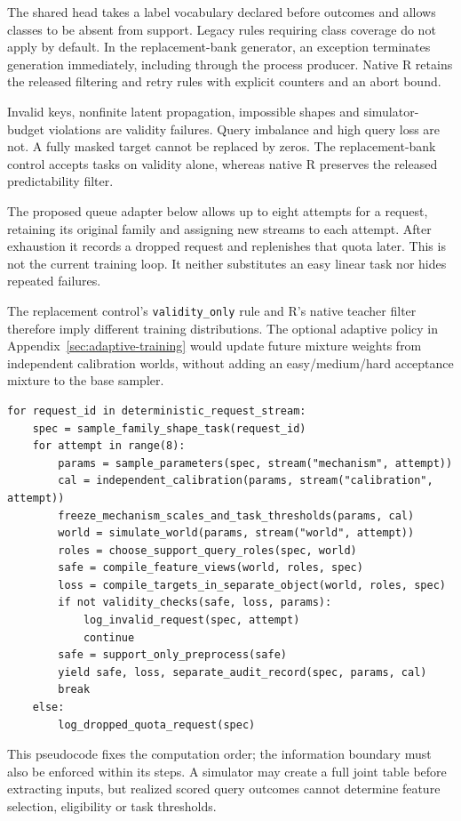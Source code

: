 \documentclass[11pt]{article}
\begin{document}
The shared head takes a label vocabulary declared before outcomes and allows classes to be absent from support. Legacy rules requiring class coverage do not apply by default. In the replacement-bank generator, an exception terminates generation immediately, including through the process producer. Native R retains the released filtering and retry rules with explicit counters and an abort bound.

Invalid keys, nonfinite latent propagation, impossible shapes and simulator-budget violations are validity failures. Query imbalance and high query loss are not. A fully masked target cannot be replaced by zeros. The replacement-bank control accepts tasks on validity alone, whereas native R preserves the released predictability filter.

The proposed queue adapter below allows up to eight attempts for a request, retaining its original family and assigning new streams to each attempt. After exhaustion it records a dropped request and replenishes that quota later. This is not the current training loop. It neither substitutes an easy linear task nor hides repeated failures.

The replacement control's \texttt{validity\_only} rule and R's native teacher filter therefore imply different training distributions. The optional adaptive policy in Appendix~\ref{sec:adaptive-training} would update future mixture weights from independent calibration worlds, without adding an easy/medium/hard acceptance mixture to the base sampler.

\begin{lstlisting}
for request_id in deterministic_request_stream:
    spec = sample_family_shape_task(request_id)
    for attempt in range(8):
        params = sample_parameters(spec, stream("mechanism", attempt))
        cal = independent_calibration(params, stream("calibration", attempt))
        freeze_mechanism_scales_and_task_thresholds(params, cal)
        world = simulate_world(params, stream("world", attempt))
        roles = choose_support_query_roles(spec, world)
        safe = compile_feature_views(world, roles, spec)
        loss = compile_targets_in_separate_object(world, roles, spec)
        if not validity_checks(safe, loss, params):
            log_invalid_request(spec, attempt)
            continue
        safe = support_only_preprocess(safe)
        yield safe, loss, separate_audit_record(spec, params, cal)
        break
    else:
        log_dropped_quota_request(spec)
\end{lstlisting}
This pseudocode fixes the computation order; the information boundary must also be enforced within its steps. A simulator may create a full joint table before extracting inputs, but realized scored query outcomes cannot determine feature selection, eligibility or task thresholds.
\end{document}
